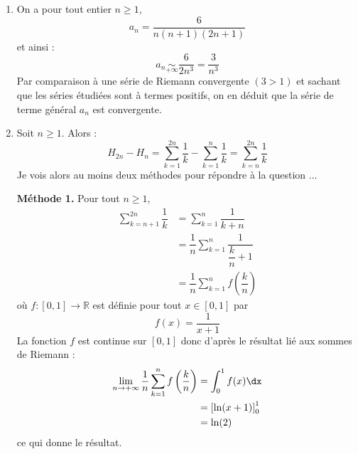 \documentclass[a4paper,10pt]{report}
\begin{document}
\corr 
\begin{enumerate}
\item On a pour tout entier $n \geq 1$,
$$ a_n = \dfrac{6}{n(n+1)(2n+1)}$$
et ainsi :
$$ a_n \underset{+ \infty}{\sim} \dfrac{6}{2n^3}= \dfrac{3}{n^3}$$
Par comparaison à une série de Riemann convergente $(3>1)$ et sachant que les séries étudiées sont à termes positifs, on en déduit que la série de terme général $a_n$ est convergente.
\item Soit $n \geq 1$. Alors :
$$ H_{2n}-H_n = \sum_{k=1}^{2n} \dfrac{1}{k} - \sum_{k=1}^{n} \dfrac{1}{k} = \sum_{k=n}^{2n} \dfrac{1}{k}$$
Je vois alors au moins deux méthodes pour répondre à la question ...

\medskip

\noindent \textbf{Méthode 1.} Pour tout $n \geq 1$,
\begin{align*}
\sum_{k=n+1}^{2n} \dfrac{1}{k} & = \sum_{k=1}^{n} \dfrac{1}{k+n} \\
& = \dfrac{1}{n} \sum_{k=1}^{n} \dfrac{1}{\dfrac{k}{n} +1} \\
& =  \dfrac{1}{n} \sum_{k=1}^n f \left( \dfrac{k}{n} \right)
\end{align*}
où $f : [0,1] \rightarrow \mathbb{R}$ est définie pour tout $x \in [0,1]$ par 
$$ f(x) = \dfrac{1}{x+1}$$
La fonction $f$ est continue sur $[0,1]$ donc d'après le résultat lié aux sommes de Riemann :
\begin{align*}
\lim_{n \rightarrow + \infty} \dfrac{1}{n} \sum_{k=1}^n f \left( \dfrac{k}{n} \right) & = \int_{0}^1 f(x) \dx \\
& = \left[\ln(x+1) \right]_0^1 \\
& = \ln(2) \\
\end{align*}
ce qui donne le résultat.

\medskip


\end{enumerate}
\end{document}
